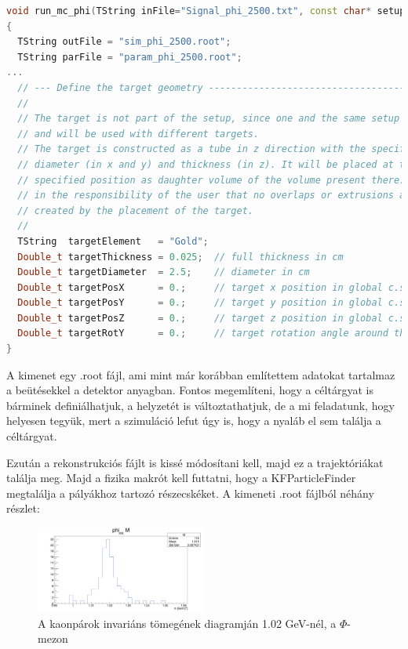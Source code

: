 \documentclass[a4paper,12pt]{article}
\begin{document}
\begin{lstlisting}[language=C++]
void run_mc_phi(TString inFile="Signal_phi_2500.txt", const char* setupName = "sis100_electron", Int_t nEvents = 2500)
{
  TString outFile = "sim_phi_2500.root";
  TString parFile = "param_phi_2500.root";
...
  // --- Define the target geometry -----------------------------------------
  //
  // The target is not part of the setup, since one and the same setup can
  // and will be used with different targets.
  // The target is constructed as a tube in z direction with the specified
  // diameter (in x and y) and thickness (in z). It will be placed at the
  // specified position as daughter volume of the volume present there. It is
  // in the responsibility of the user that no overlaps or extrusions are
  // created by the placement of the target.
  //
  TString  targetElement   = "Gold";
  Double_t targetThickness = 0.025;  // full thickness in cm
  Double_t targetDiameter  = 2.5;    // diameter in cm
  Double_t targetPosX      = 0.;     // target x position in global c.s. [cm]
  Double_t targetPosY      = 0.;     // target y position in global c.s. [cm]
  Double_t targetPosZ      = 0.;     // target z position in global c.s. [cm]
  Double_t targetRotY      = 0.;     // target rotation angle around the y axis [deg]
}
\end{lstlisting} 
\par A kimenet egy .root fájl, ami mint már korábban említettem adatokat tartalmaz a beütésekkel a detektor anyagban. Fontos megemlíteni, 
hogy a céltárgyat is bárminek definiálhatjuk, a helyzetét is változtathatjuk, de a mi feladatunk, hogy helyesen tegyük, mert a szimuláció lefut 
úgy is, hogy a nyaláb el sem találja a céltárgyat. 
\vspace{5mm}
\par Ezután a rekonstrukciós fájlt is kissé módosítani kell, majd ez a trajektóriákat találja meg. Majd a fizika makrót kell futtatni, hogy a 
KFParticleFinder megtalálja a pályákhoz tartozó részecskéket. A kimeneti .root fájlból néhány részlet:
\begin{figure}[H]
	\centering
	\includegraphics[width=0.5\textwidth]{phiKK_2500phi.png}
	\caption{ A kaonpárok invariáns tömegének diagramján 1.02 GeV-nél, a $\Phi$-mezon }
\end{figure}
\end{document}
